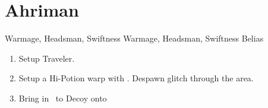 \chapter{Ahriman}
\begin{liscense}
	\begin{itemize}
		\ashef Warmage, Headsman, Swiftness
		\penelof Warmage, Headsman, Swiftness
		\vaanf Belias
	\end{itemize}
\end{liscense}
\begin{enumerate}
	\item Setup Traveler.
	\item Setup a Hi-Potion warp with \basch. Despawn glitch through the area.
	\item Bring in \ashe\ to Decoy onto \vaan
\end{enumerate}